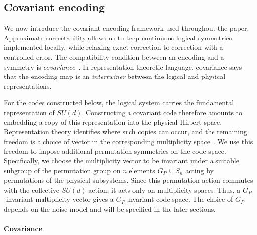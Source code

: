 \documentclass[10pt,twocolumn,superscriptaddress,aps,amsmath,amssymb,citeautoscript,floatfix,prx]{revtex4-2}
\theoremstyle{plain}
\theoremstyle{plain}
\theoremstyle{plain}
\theoremstyle{plain}
\theoremstyle{plain}
\theoremstyle{plain}
\theoremstyle{plain}
\theoremstyle{definition}
\theoremstyle{plain}
\begin{document}
\subsection{Covariant encoding}\label{subsec:main_covar_enc}

We now introduce the covariant encoding framework used throughout the paper. Approximate correctability allows us to keep 
continuous logical symmetries implemented locally, while relaxing exact correction to correction with a controlled error. 
The compatibility condition between an encoding and a symmetry is \textit{covariance}~\cite{Hayden2021}. 
In representation-theoretic language, covariance says that the encoding map is an \textit{intertwiner} between the logical and physical representations.

For the codes constructed below, the logical system carries the fundamental representation of $SU(d)$. 
Constructing a covariant code therefore amounts to embedding a copy of this representation into the physical Hilbert space. 
Representation theory identifies where such copies can occur, and the remaining freedom is a choice of vector in the corresponding multiplicity 
space~\cite{Denys2024}. We use this freedom to impose additional permutation symmetries on the code space. 
Specifically, we choose the multiplicity vector to be invariant under a suitable subgroup of the permutation group on $n$ elements $G_P\subseteq S_n$ 
acting by permutations of the physical subsystems. Since this permutation action commutes with the collective $SU(d)$ action, 
it acts only on multiplicity spaces. Thus, a $G_P$-invariant multiplicity vector gives a $G_P$-invariant code space. 
The choice of $G_P$ depends on the noise model and will be specified in the later sections.

\paragraph{Covariance.}
\end{document}
